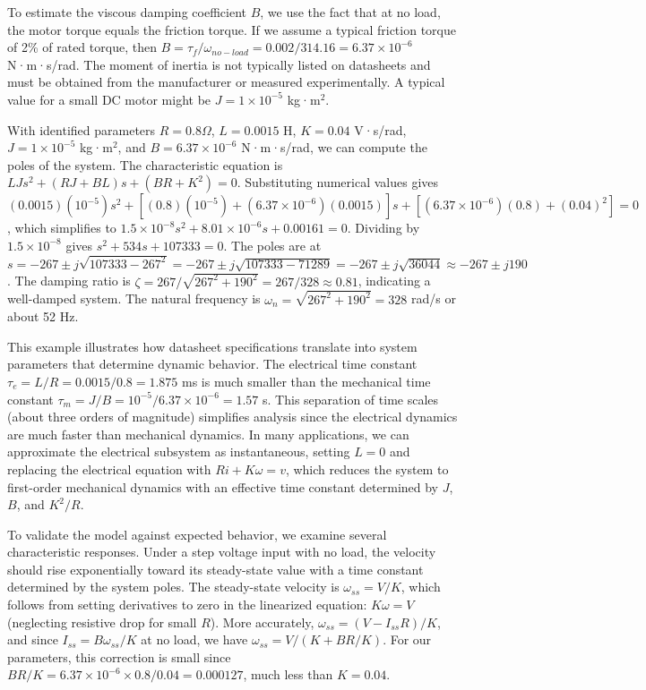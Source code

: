 To estimate the viscous damping coefficient $B$, we use the fact that at no load, the motor torque equals the friction torque. If we assume a typical friction torque of 2\% of rated torque, then $B = \tau_f / \omega_{no-load} = 0.002 / 314.16 = 6.37 \times 10^{-6}$ N·m·s/rad. The moment of inertia is not typically listed on datasheets and must be obtained from the manufacturer or measured experimentally. A typical value for a small DC motor might be $J = 1 \times 10^{-5}$ kg·m$^2$.

With identified parameters $R = 0.8 \Omega$, $L = 0.0015$ H, $K = 0.04$ V·s/rad, $J = 1 \times 10^{-5}$ kg·m$^2$, and $B = 6.37 \times 10^{-6}$ N·m·s/rad, we can compute the poles of the system. The characteristic equation is $LJ s^2 + (RJ + BL)s + (BR + K^2) = 0$. Substituting numerical values gives $(0.0015)(10^{-5}) s^2 + [(0.8)(10^{-5}) + (6.37 \times 10^{-6})(0.0015)] s + [(6.37 \times 10^{-6})(0.8) + (0.04)^2] = 0$, which simplifies to $1.5 \times 10^{-8} s^2 + 8.01 \times 10^{-6} s + 0.00161 = 0$. Dividing by $1.5 \times 10^{-8}$ gives $s^2 + 534 s + 107333 = 0$. The poles are at $s = -267 \pm j\sqrt{107333 - 267^2} = -267 \pm j\sqrt{107333 - 71289} = -267 \pm j\sqrt{36044} \approx -267 \pm j190$. The damping ratio is $\zeta = 267 / \sqrt{267^2 + 190^2} = 267 / 328 \approx 0.81$, indicating a well-damped system. The natural frequency is $\omega_n = \sqrt{267^2 + 190^2} = 328$ rad/s or about 52 Hz.

This example illustrates how datasheet specifications translate into system parameters that determine dynamic behavior. The electrical time constant $\tau_e = L/R = 0.0015/0.8 = 1.875$ ms is much smaller than the mechanical time constant $\tau_m = J/B = 10^{-5}/6.37 \times 10^{-6} = 1.57$ s. This separation of time scales (about three orders of magnitude) simplifies analysis since the electrical dynamics are much faster than mechanical dynamics. In many applications, we can approximate the electrical subsystem as instantaneous, setting $L = 0$ and replacing the electrical equation with $Ri + K\omega = v$, which reduces the system to first-order mechanical dynamics with an effective time constant determined by $J$, $B$, and $K^2/R$.

To validate the model against expected behavior, we examine several characteristic responses. Under a step voltage input with no load, the velocity should rise exponentially toward its steady-state value with a time constant determined by the system poles. The steady-state velocity is $\omega_{ss} = V/K$, which follows from setting derivatives to zero in the linearized equation: $K\omega = V$ (neglecting resistive drop for small $R$). More accurately, $\omega_{ss} = (V - I_{ss}R)/K$, and since $I_{ss} = B\omega_{ss}/K$ at no load, we have $\omega_{ss} = V / (K + B R / K)$. For our parameters, this correction is small since $BR/K = 6.37 \times 10^{-6} \times 0.8 / 0.04 = 0.000127$, much less than $K = 0.04$.

